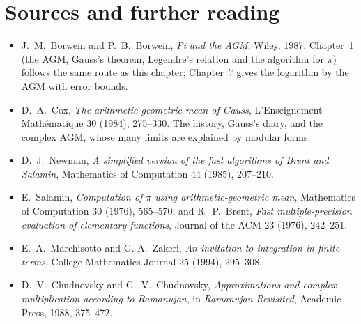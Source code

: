 \section*{Sources and further reading}

\begin{itemize}
\item J.~M.~Borwein and P.~B.~Borwein, \emph{Pi and the AGM}, Wiley, 1987. Chapter~1 (the AGM, Gauss's theorem, Legendre's relation and the
algorithm for $\pi$) follows the same route as this chapter; Chapter~7 gives the logarithm by the AGM with error bounds.
\item D.~A.~Cox, \emph{The arithmetic-geometric mean of Gauss}, L'Enseignement Math\'ematique 30 (1984), 275--330. The history, Gauss's diary,
and the complex AGM, whose many limits are explained by modular forms.
\item D.~J.~Newman, \emph{A simplified version of the fast algorithms of Brent and Salamin}, Mathematics of Computation 44 (1985), 207--210.
\item E.~Salamin, \emph{Computation of $\pi$ using arithmetic-geometric mean}, Mathematics of Computation 30 (1976), 565--570; and R.~P.~Brent,
\emph{Fast multiple-precision evaluation of elementary functions}, Journal of the ACM 23 (1976), 242--251.
\item E.~A.~Marchisotto and G.-A.~Zakeri, \emph{An invitation to integration in finite terms}, College Mathematics Journal 25 (1994), 295--308.
\item D.~V.~Chudnovsky and G.~V.~Chudnovsky, \emph{Approximations and complex multiplication according to Ramanujan}, in \emph{Ramanujan
Revisited}, Academic Press, 1988, 375--472.
\end{itemize}
